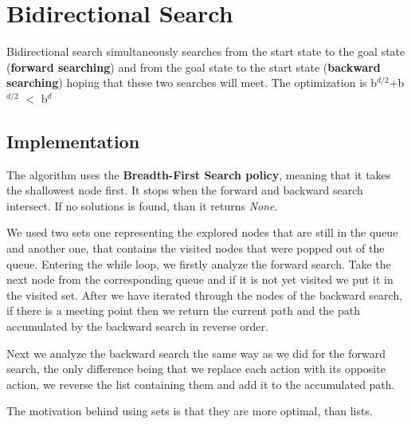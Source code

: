 \documentclass{report}
\begin{document}
\chapter{Bidirectional Search} 

Bidirectional search simultaneously searches from the start state to the goal state (\textbf{forward searching}) and from the goal state to the start state  (\textbf{backward searching}) hoping that these two searches will meet. 
The optimization is b$^{d/2}$+b$^{d/2}$ $<$ b$^d$ 

\section{Implementation}


The algorithm uses the \textbf{Breadth-First Search policy}, meaning that it takes the shallowest node first. It stops when the forward and backward search intersect. If no solutions is found, than it returns \textit{None}.

We used two sets one representing the explored nodes that are still in the queue and another one, that contains the visited nodes that were popped out of the queue.
Entering the while loop, we firstly analyze the forward search. Take the next node from the corresponding queue and if it is not yet visited we put it in the visited set. After we have iterated through the nodes of the backward search, if there is a meeting point then we return the current path and the path accumulated by the backward search in reverse order.

Next we analyze the backward search the same way as we did for the forward search, the only difference being that we replace each action with its opposite action, we reverse the list containing them and add it to the accumulated path.

The motivation behind using sets is that they are more optimal, than lists. 
\end{document}

